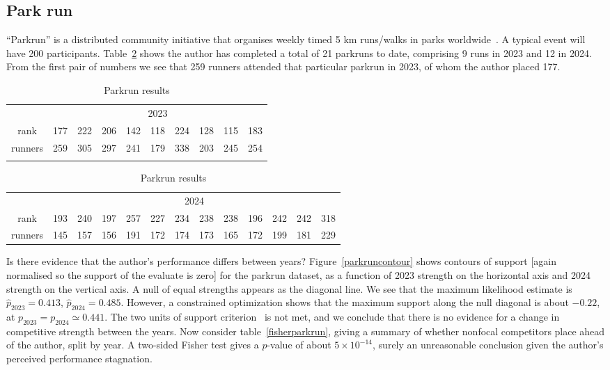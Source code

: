 \documentclass[article]{ajs}
\begin{document}
\subsection{Park run}

``Parkrun'' is a distributed community initiative that organises
weekly timed 5 km runs/walks in parks worldwide~\citep{hindley2020}.
A typical event will have 200 participants.  Table~\ref{parkruntable}
shows the author has completed a total of 21 parkruns to date,
comprising 9 runs in 2023 and 12 in 2024.  From the first pair of
numbers we see that 259 runners attended that particular parkrun in
2023, of whom the author placed 177.

\begin{table}[t]
  \centering
  \caption{Parkrun results}
\label{parkruntable}
\begin{tabular}{cccccccccc}\\
 & \multicolumn{9}{c}{2023}\\
rank   & 177& 222& 206& 142& 118& 224& 128& 115& 183\\
runners& 259& 305& 297& 241& 179& 338& 203& 245& 254\\ \\
\end{tabular}
\begin{tabular}{ccccccccccccc}
  & \multicolumn{12}{c}{2024}\\
rank   &  193& 240& 197& 257& 227& 234& 238& 238& 196& 242& 242& 318\\
runners&  145& 157& 156& 191& 172& 174& 173& 165& 172& 199& 181& 229\\
\end{tabular}
\end{table}

Is there evidence that the author's performance differs between years?
Figure~\ref{parkruncontour} shows contours of support [again
  normalised so the support of the evaluate is zero] for the parkrun
dataset, as a function of 2023 strength on the horizontal axis and
2024 strength on the vertical axis.  A null of equal strengths appears
as the diagonal line.  We see that the maximum likelihood estimate is
$\hat{p}_\mathrm{2023}=0.413$, $\hat{p}_\mathrm{2024}=0.485$.
However, a constrained optimization shows that the maximum support
along the null diagonal is about $-0.22$, at
${p}_\mathrm{2023}={p}_\mathrm{2024}\simeq 0.441$.  The two units of
support criterion~\citep{edwards1992} is not met, and we conclude that
there is no evidence for a change in competitive strength between the
years.  Now consider table~\ref{fisherparkrun}, giving a summary of
whether nonfocal competitors place ahead of the author, split by year.
A two-sided Fisher test gives a $p$-value of about $5\times 10^{-14}$,
surely an unreasonable conclusion given the author's perceived
performance stagnation.
\end{document}
